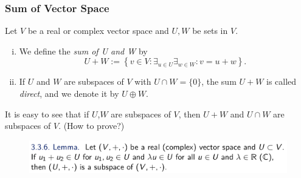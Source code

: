 \documentclass[12pt, t]{beamer}
\renewcommand{\emph}[1]{{\color{Turquoise3}\textsl{#1}}}
\begin{document}
\begin{frame}[allowframebreaks]
    \frametitle{Sum of Vector Space}
    Let $V$ be a real or complex vector space and $U,W$ be sets in $V$.
    \begin{enumerate}[(i)]
        \item We define the \emph{sum of U and W} by
              \[U+W:=\left\{v\in V:\mathop{\exists}_{u\in U}\mathop{\exists}_{w\in W}: v=u+w\right\}.\]
        \item If $U$ and $W$ are subspaces of $V$ with $U\cap W=\{0\}$, the sum $U+W$ is called \emph{direct}, and we denote it by $U\oplus W$.
    \end{enumerate}

    It is easy to see that if $U$,$W$ are subspaces of $V$, then $U + W$ and $U\cap W$ are subspaces of $V$. (How to prove?)
    \begin{figure}[H]
        \centering
        \includegraphics[width=1\textwidth]{2020-05-16-10-31-38.png}
    \end{figure}


\end{frame}
\end{document}
